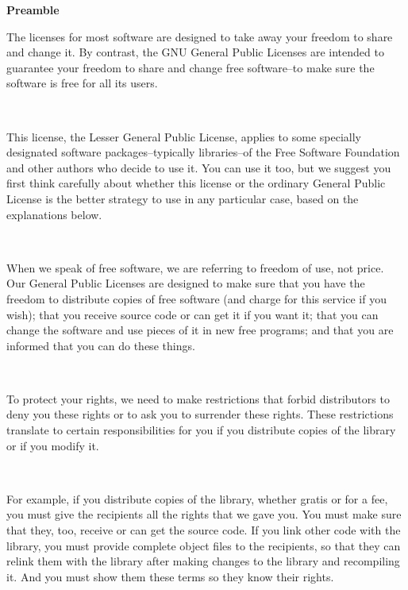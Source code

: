 \begin{center}
{\large \bf Preamble}
\end{center}
\begin{center}
\begin{minipage}{5.25in}
The licenses for most software are designed to take away your
freedom to share and change it.  By contrast, the GNU General Public
Licenses are intended to guarantee your freedom to share and change
free software--to make sure the software is free for all its users.
\end{minipage}
\\[2.5mm]

\begin{minipage}{5.25in}
This license, the Lesser General Public License, applies to some
specially designated software packages--typically libraries--of the
Free Software Foundation and other authors who decide to use it.  You
can use it too, but we suggest you first think carefully about whether
this license or the ordinary General Public License is the better
strategy to use in any particular case, based on the explanations below.
\end{minipage}
\\[2.5mm]

\begin{minipage}{5.25in}
When we speak of free software, we are referring to freedom of use,
not price.  Our General Public Licenses are designed to make sure that
you have the freedom to distribute copies of free software (and charge
for this service if you wish); that you receive source code or can get
it if you want it; that you can change the software and use pieces of
it in new free programs; and that you are informed that you can do
these things.
\end{minipage}
\\[2.5mm]

\begin{minipage}{5.25in}
To protect your rights, we need to make restrictions that forbid
distributors to deny you these rights or to ask you to surrender these
rights.  These restrictions translate to certain responsibilities for
you if you distribute copies of the library or if you modify it.
\end{minipage}
\\[2.5mm]

\begin{minipage}{5.25in}
For example, if you distribute copies of the library, whether gratis
or for a fee, you must give the recipients all the rights that we gave
you.  You must make sure that they, too, receive or can get the source
code.  If you link other code with the library, you must provide
complete object files to the recipients, so that they can relink them
with the library after making changes to the library and recompiling
it.  And you must show them these terms so they know their rights.
\end{minipage}
\\[2.5mm]


\end{center}
